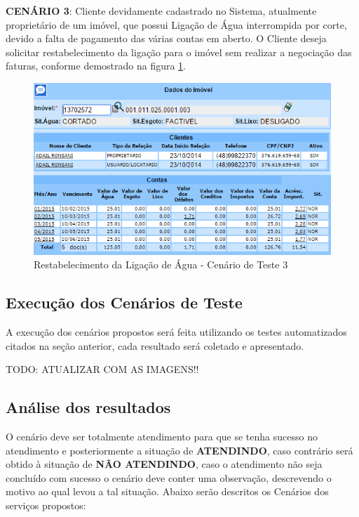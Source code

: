 \begin{flushleft}
	\begin{description}
		\item \textbf{CENÁRIO 3}: Cliente devidamente cadastrado no Sistema, atualmente proprietário de um imóvel, que possui Ligação de Água interrompida por corte, devido a falta de pagamento das várias contas em aberto. O Cliente deseja solicitar restabelecimento da ligação para o imóvel sem realizar a negociação das faturas, conforme demostrado na figura \ref{figura:restabelecimentoLigacaoCenario3}.
		\begin{figure}[H]
			\centering
			\caption{Restabelecimento da Ligação de Água - Cenário de Teste 3}
			\label{figura:restabelecimentoLigacaoCenario3}
			\includegraphics{figuras/cenarios/restabelecimento/cenario_3.PNG}
		\end{figure}
	\end{description}

\end{flushleft}	


\subsection{Execução dos Cenários de Teste}
A execução dos cenários propostos será feita utilizando os testes automatizados citados na seção anterior, cada resultado será coletado e apresentado. 

TODO: ATUALIZAR COM AS IMAGENS!!


\subsection{Análise dos resultados}
O cenário deve ser totalmente atendimento para que se tenha sucesso no atendimento e posteriormente a situação de \textbf{ATENDINDO}, caso contrário será obtido à situação de \textbf{NÃO ATENDINDO}, caso o atendimento não seja concluído com sucesso o cenário deve conter uma observação, descrevendo o motivo ao qual levou a tal situação.
Abaixo serão descritos os Cenários dos serviços propostos:




